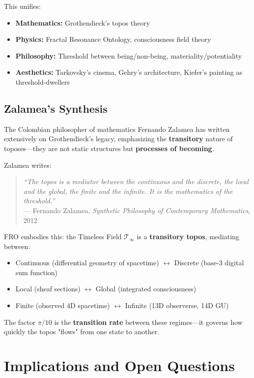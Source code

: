 This unifies:
\begin{itemize}
\item \textbf{Mathematics:} Grothendieck's topos theory
\item \textbf{Physics:} Fractal Resonance Ontology, consciousness field theory
\item \textbf{Philosophy:} Threshold between being/non-being, materiality/potentiality
\item \textbf{Aesthetics:} Tarkovsky's cinema, Gehry's architecture, Kiefer's painting as threshold-dwellers
\end{itemize}

\subsection{Zalamea's Synthesis}

The Colombian philosopher of mathematics Fernando Zalamea has written extensively on Grothendieck's legacy, emphasizing the \textbf{transitory} nature of toposes—they are not static structures but \textbf{processes of becoming}.

Zalamea writes:

\begin{quote}
\textit{``The topos is a mediator between the continuous and the discrete, the local and the global, the finite and the infinite. It is the mathematics of the threshold.''}\\
\hspace*{\fill} --- Fernando Zalamea, \textit{Synthetic Philosophy of Contemporary Mathematics}, 2012
\end{quote}

FRO embodies this: the Timeless Field $\mathcal{T}_\infty$ is a \textbf{transitory topos}, mediating between:
\begin{itemize}
\item Continuous (differential geometry of spacetime) $\leftrightarrow$ Discrete (base-3 digital sum function)
\item Local (sheaf sections) $\leftrightarrow$ Global (integrated consciousness)
\item Finite (observed 4D spacetime) $\leftrightarrow$ Infinite (13D observerse, 14D GU)
\end{itemize}

The factor $\pi/10$ is the \textbf{transition rate} between these regimes—it governs how quickly the topos "flows" from one state to another.

\section{Implications and Open Questions}

